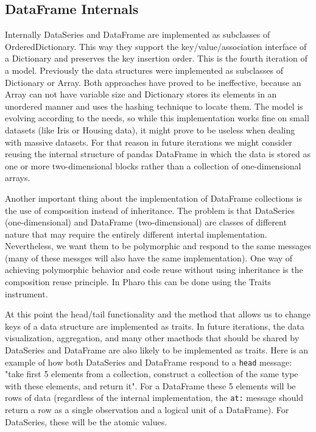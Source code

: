 \documentclass{article}
\begin{document}
\begin{multicols}{2}
\subsection{DataFrame Internals}
Internally DataSeries and DataFrame are implemented as subclasses of OrderedDictionary. This way they support the key/value/association interface of a Dictionary and preserves the key insertion order. This is the fourth iteration of a model. Previously the data structures were implemented as subclasses of Dictionary or Array. Both approaches have proved to be ineffective, because an Array can not have variable size and Dictionary stores its elements in an unordered manner and uses the hashing technique to locate them\cite{Goldberg}. The model is evolving according to the needs, so while this implementation works fine on small datasets (like Iris or Housing data), it might prove to be useless when dealing with massive datasets. For that reason in future iterations we might consider reusing the internal structure of pandas DataFrame in which the data is stored as one or more two-dimensional blocks rather than a collection of one-dimensional arrays\cite{McKinney}.

Another important thing about the implementation of DataFrame collections is the use of composition instead of inheritance. The problem is that DataSeries (one-dimensional) and DataFrame (two-dimensional) are classes of different nature that may require the entirely different intertal implementation. Nevertheless, we want them to be polymorphic and respond to the same messages (many of these messges will also have the same implementation). One way of achieving polymorphic behavior and code reuse without using inheritance is the composition reuse principle. In Pharo this can be done using the Traits instrument.

At this point the head/tail functionality and the method that allows us to change keys of a data structure are implemented as traits. In future iterations, the data visualization, aggregation, and many other maethods that should be shared by DataSeries and DataFrame are also likely to be implemented as traits. Here is an example of how both DataSeries and DataFrame respond to a \texttt{head} message: "take first 5 elements from a collection, construct a collection of the same type with these elements, and return it". For a DataFrame these 5 elements will be rows of data (regardless of the internal implementation, the \texttt{at:} message should return a row as a single observation and a logical unit of a DataFrame). For DataSeries, these will be the atomic values.


\end{multicols}
\end{document}
